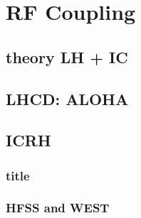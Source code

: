 \chapter{RF Coupling}

\section{theory LH + IC}

\section{LHCD: ALOHA}

\section{ICRH}

\subsection{title}

\subsection{HFSS and WEST}